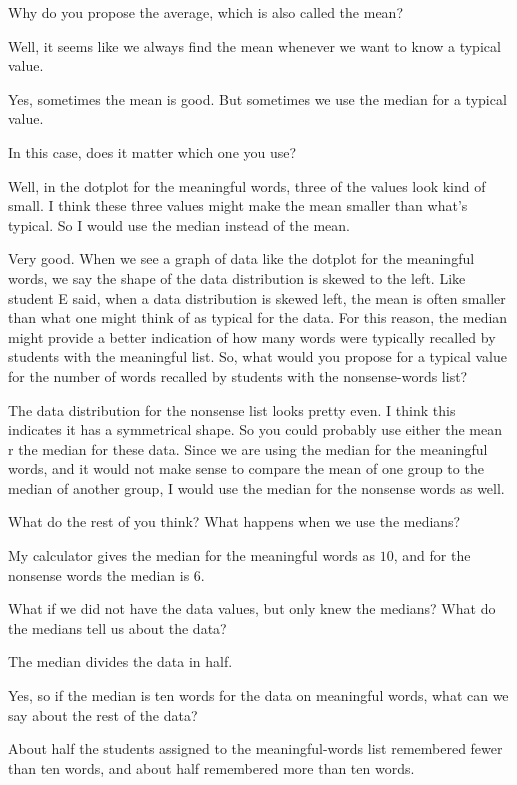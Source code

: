 \documentclass[
  10pt,
  a4paper,
  landscape,
  twoside,
  openany
]{scrbook}
\newlength{\scriptlabelwidth}
\newcommand{\scriptlabel}[1]{%
  \normalfont\slshape\makebox[\scriptlabelwidth][l]{#1}%
}
\newenvironment{scriptlist}{%
  \begin{list}{}{%
    \setlength{\labelwidth}{\scriptlabelwidth}%
    \setlength{\labelsep}{0.6em}%
    \setlength{\leftmargin}{\dimexpr\labelwidth+\labelsep\relax}%
    \setlength{\itemindent}{0pt}%
    \setlength{\listparindent}{0pt}%
    \setlength{\parsep}{0pt}%
    \setlength{\itemsep}{0.35\baselineskip}%
    \setlength{\topsep}{0.35\baselineskip}%
    \let\makelabel\scriptlabel
  }%
}{%
  \end{list}%
}
\begin{document}
{\begin{scriptlist}
  \item [Teacher:] Why do you propose the average, which is also called the mean?
  \item [Student D:] Well, it seems like we always find the mean whenever we want to know a typical value.
  \item [Student E:] Yes, sometimes the mean is good. But sometimes we use the median for a typical value.
  \item [Teacher:] In this case, does it matter which one you use?
  \item [Student E:] Well, in the dotplot for the meaningful words, three of the values look kind of small. I think these three values might make the mean smaller than what's typical. So I would use the median instead of the mean.
  \item [Teacher:] Very good. When we see a graph of data like the dotplot for the meaningful words, we say the shape of the data distribution is skewed to the left. Like student E said, when a data distribution is skewed left, the mean is often smaller than what one might think of as typical for the data. For this reason, the median might provide a better indication of how many words were typically recalled by students with the meaningful list. So, what would you propose for a typical value for the number of words recalled by students with the nonsense-words list?
  \item [Student E:] The data distribution for the nonsense list looks pretty even. I think this indicates it has a symmetrical shape. So you could probably use either the mean r the median for these data. Since we are using the median for the meaningful words, and it would not make sense to compare the mean of one group to the median of another group, I would use the median for the nonsense words as well.
  \item [Teacher:] What do the rest of you think? What happens when we use the medians?
  \item [Student D:] My calculator gives the median for the meaningful words as $10$, and for the nonsense words the median is $6$. 
  \item [Teacher:] What if we did not have the data values, but only knew the medians? What do the medians tell us about the data?
  \item [Student D:] The median divides the data in half.
  \item [Teacher:] Yes, so if the median is ten words for the data on meaningful words, what can we say about the rest of the data?
  \item [Student F:] About half the students assigned to the meaningful-words list remembered fewer than ten words, and about half remembered more than ten words.

\end{scriptlist}}
\end{document}
